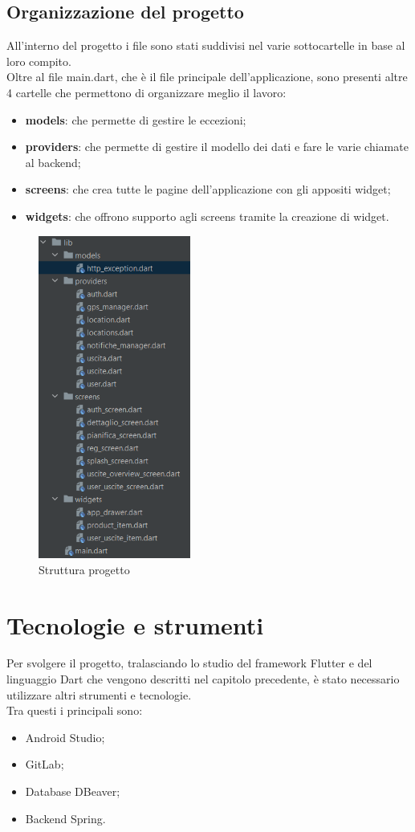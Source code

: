  \newpage

\subsection{Organizzazione del progetto}

All'interno del progetto i file sono stati suddivisi nel varie sottocartelle in base al loro compito.\\
Oltre al file main.dart, che è il file principale dell'applicazione, sono presenti altre 4 cartelle che permettono di organizzare meglio il lavoro:
\begin{itemize}
	\item \textbf{models}: che permette di gestire le eccezioni;
	\item \textbf{providers}: che permette di gestire il modello dei dati e fare le varie chiamate al backend;
	\item \textbf{screens}: che crea tutte le pagine dell'applicazione con gli appositi widget;
	\item \textbf{widgets}: che offrono supporto agli screens tramite la creazione di widget.
\end{itemize}
\begin{figure}[htbp]	
	\centering
	\includegraphics[width=5cm]{immagini/struttura.png}
	\caption{Struttura progetto}
	\label{fig:Struttura progetto}
\end{figure}

\newpage

\section{Tecnologie e strumenti}
Per svolgere il progetto, tralasciando lo studio del framework Flutter e del linguaggio Dart che vengono descritti nel capitolo precedente, è stato necessario utilizzare altri strumenti e tecnologie.\\
Tra questi i principali sono:
\begin{itemize}
	\item Android Studio;
	\item GitLab;
	\item Database DBeaver;
	\item Backend Spring.
\end{itemize}

